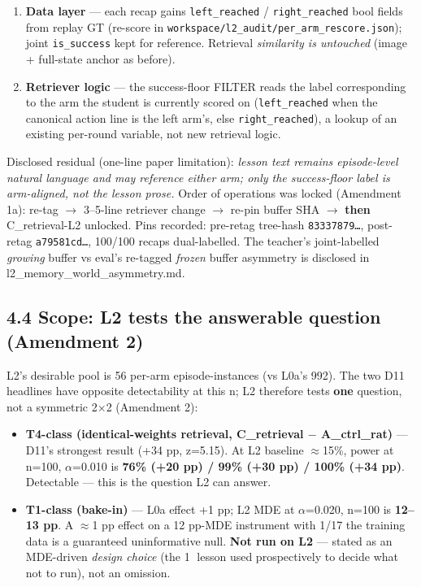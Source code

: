\begin{enumerate}
\item \textbf{Data layer} --- each recap gains \texttt{left\_reached} / \texttt{right\_reached}
   bool fields from replay GT (re-score in
   \texttt{workspace/l2\_audit/per\_arm\_rescore.json}); joint \texttt{is\_success} kept for
   reference. Retrieval \emph{similarity is untouched} (image + full-state
   anchor as before).
\item \textbf{Retriever logic} --- the success-floor FILTER reads the label
   corresponding to the arm the student is currently scored on
   (\texttt{left\_reached} when the canonical action line is the left arm's, else
   \texttt{right\_reached}), a lookup of an existing per-round variable, not new
   retrieval logic.
\end{enumerate}

Disclosed residual (one-line paper limitation): \emph{lesson text remains
episode-level natural language and may reference either arm; only the
success-floor label is arm-aligned, not the lesson prose.} Order of
operations was locked (Amendment 1a): re-tag $\rightarrow$ 3--5-line retriever change $\rightarrow$
re-pin buffer SHA $\rightarrow$ \textbf{then} C\_retrieval-L2 unlocked. Pins recorded:
pre-retag tree-hash \texttt{83337879\ldots}, post-retag \texttt{a79581cd\ldots}, 100/100 recaps
dual-labelled. The teacher's joint-labelled \emph{growing} buffer vs eval's
re-tagged \emph{frozen} buffer asymmetry is disclosed in
l2\_memory\_world\_asymmetry.md.

\subsection*{4.4 Scope: L2 tests the answerable question (Amendment 2)}

L2's desirable pool is 56 per-arm episode-instances (vs L0a's 992). The
two D11 headlines have opposite detectability at this n; L2 therefore
tests \textbf{one} question, not a symmetric 2$\times$2 (Amendment 2):

\begin{itemize}
\item \textbf{T4-class (identical-weights retrieval, C\_retrieval $-$ A\_ctrl\_rat)} ---
  D11's strongest result (+34 pp, z=5.15). At L2 baseline $\approx$15\%, power at
  n=100, $\alpha$=0.010 is \textbf{76\% (+20 pp) / 99\% (+30 pp) / 100\% (+34 pp)}.
  Detectable --- this is the question L2 can answer.
\item \textbf{T1-class (bake-in)} --- L0a effect +1 pp; L2 MDE at $\alpha$=0.020, n=100 is
  \textbf{12--13 pp}. A $\approx$1 pp effect on a 12 pp-MDE instrument with 1/17 the
  training data is a guaranteed uninformative null. \textbf{Not run on L2} ---
  stated as an MDE-driven \emph{design choice} (the \textcircled{1} lesson used
  prospectively to decide what not to run), not an omission.
\end{itemize}

